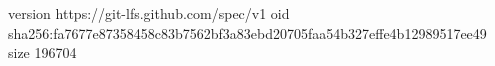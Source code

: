 version https://git-lfs.github.com/spec/v1
oid sha256:fa7677e87358458c83b7562bf3a83ebd20705faa54b327effe4b12989517ee49
size 196704
